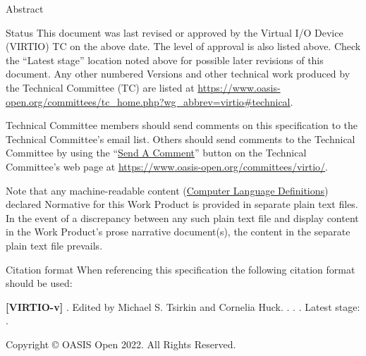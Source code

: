 \begin{titlepage}
\begin{oasistitlesection}{Abstract}

\end{oasistitlesection}

\begin{oasistitlesection}{Status}
This document was last revised or approved by the Virtual I/O Device
(VIRTIO) TC on the above date. The level of approval is also listed above. Check the ``Latest stage'' location noted above for possible later revisions of this document.
Any other numbered Versions and other
technical work produced by the Technical Committee (TC) are
listed at
\url{https://www.oasis-open.org/committees/tc_home.php?wg_abbrev=virtio#technical}.

Technical Committee members should send comments on this
specification to the Technical Committee’s email list. Others
should send comments to the Technical Committee by using the
``\href{https://www.oasis-open.org/committees/comments/form.php?wg_abbrev=virtio}{Send
A Comment}'' button on the Technical Committee’s web page at
\url{https://www.oasis-open.org/committees/virtio/}.



Note that any machine-readable content
(\href{https://www.oasis-open.org/policies-guidelines/tc-process#wpComponentsCompLang}
{Computer Language Definitions}) declared Normative for this Work
Product is provided in separate plain text files. In the event of
a discrepancy between any such plain text file and display
content in the Work Product's prose narrative document(s), the
content in the separate plain text file prevails.

\end{oasistitlesection}


\begin{oasistitlesection}{Citation format}
When referencing this specification the following citation format should be used:\newline

\textbf{[VIRTIO-v\virtiorev]}\newline
\textit{\virtioversion}. Edited by Michael S. Tsirkin and Cornelia Huck. \virtioworkingdraftdate.
\virtiodraftoasisstagename \virtiodraftstageextra . \virtiourlhtml .
Latest stage: \virtiourllatesthtml .
\end{oasistitlesection}

\vfill\newpage


Copyright © OASIS Open 2022. All Rights Reserved.


\end{titlepage}
